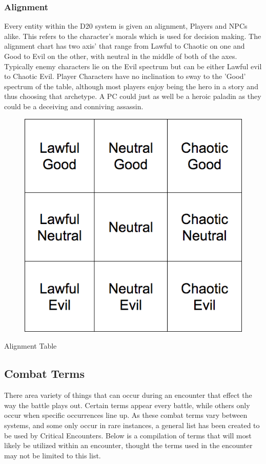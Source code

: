 \documentclass[12pt,a4paper]{report}
\begin{document}
		\subsubsection{Alignment}
		Every entity within the D20 system is given an alignment, Players and NPCs alike. This refers to the character's morals which is used for decision making. The alignment chart has two axis' that range from Lawful to Chaotic on one and Good to Evil on the other, with neutral in the middle of both of the axes. Typically enemy characters lie on the Evil spectrum but can be either Lawful evil to Chaotic Evil. Player Characters have no inclination to sway to the 'Good' spectrum of the table, although most players enjoy being the hero in a story and thus choosing that archetype. A PC could just as well be a heroic paladin as they could be a deceiving and conniving assassin.
		\begin{table}[H]
			\begin{center}
				\begin{figure}[H]
					\centering
					\includegraphics[scale=.4]{alignment}
				\end{figure}
			\end{center}
		\caption{Alignment Table} \label{tab: Alignment Table}
		\end{table}
		\newpage
		\subsection{Combat Terms}
			There area variety of things that can occur during an encounter that effect the way the battle plays out. Certain terms appear every battle, while others only occur when specific occurrences line up. As these combat terms vary between systems, and some only occur in rare instances, a general list has been created to be used by Critical Encounters. Below is a compilation of terms that will most likely be utilized within an encounter, thought the terms used in the encounter may not be limited to this list.
\end{document}
